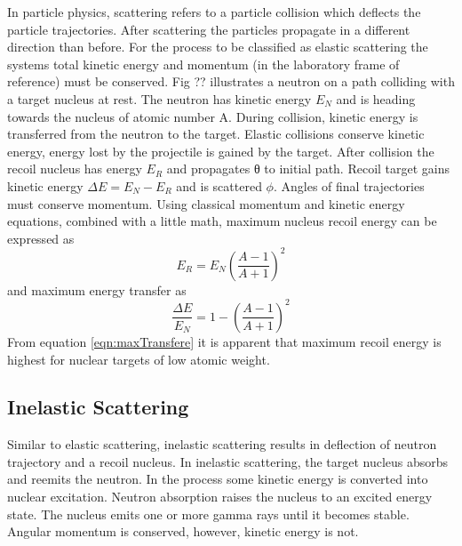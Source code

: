In particle physics, scattering refers to a particle collision which deflects the particle trajectories. After scattering the particles propagate in a different direction than before. For the process to be classified as elastic scattering the systems total kinetic energy and momentum (in the laboratory frame of reference) must be conserved.
Fig ?? illustrates a neutron on a path colliding with a target nucleus at rest. The neutron has kinetic energy $E_N$  and is heading towards the nucleus of atomic number A. During collision, kinetic energy is transferred from the neutron to the target. Elastic collisions conserve kinetic energy, energy lost by the projectile is gained by the target. After collision the recoil nucleus has energy $E_R$ and propagates θ to initial path. Recoil target gains kinetic energy $\Delta E = E_N-E_R$ and is scattered $\phi$. Angles of final trajectories must conserve momentum.
Using classical momentum and kinetic energy equations, combined with a little math, maximum nucleus recoil energy can be expressed as
      \begin{equation}
      \label{eqn:maxRecoil}
      E_R=E_N \left (\frac{A-1}{A+1}  \right )^2
      \end{equation}
and maximum energy transfer as
      \begin{equation}
      \label{eqn:maxTransfere}
      \frac{\Delta E}{E_N} =1- \left (\frac{A-1}{A+1}  \right )^2
      \end{equation}
From equation \ref{eqn:maxTransfere} it is apparent that maximum recoil energy is highest for nuclear targets of low atomic weight.


\subsection{Inelastic Scattering}
Similar to elastic scattering, inelastic scattering results in deflection of neutron trajectory and a recoil nucleus. In inelastic scattering, the target nucleus absorbs and reemits the neutron. In the process some kinetic energy is converted into nuclear excitation. Neutron absorption raises the nucleus to an excited energy state. The nucleus emits one or more gamma rays until it becomes stable. Angular momentum is conserved, however, kinetic energy is not.


